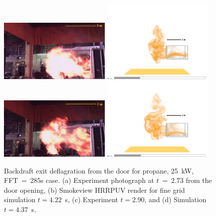 \documentclass[12pt,letterpaper]{article}
\begin{document}
\begin{flushleft}
%
\begin{figure}[tb]
    \centering
    \includegraphics[trim = 0mm 0mm 0mm 0mm, clip,width=0.48\textwidth]{IAFSS_Paper/Figures/246 vlcsnap-2023-01-30-22h18m26s991.png}
    \includegraphics[trim = 50mm 50mm 60mm 80mm, clip,width=0.48\textwidth]{IAFSS_Paper/Figures/NIST_Backdraft_Propane_25kW_285s_low_EXT2_HRRPUV_4p22s.png}
     \\
    \includegraphics[trim = 0mm 0mm 0mm 0mm, clip,width=0.48\textwidth]{IAFSS_Paper/Figures/246 vlcsnap-2023-01-30-22h18m40s863.png}
    \includegraphics[trim = 50mm 50mm 60mm 80mm, clip,width=0.48\textwidth]{IAFSS_Paper/Figures/NIST_Backdraft_Propane_25kW_285s_low_EXT2_HRRPUV_4p37s.png}
    \caption{Backdraft exit deflagration from the door for propane, 25~kW, FFT~=~285s case. (a) Experiment photograph at $t~=~2.73$ from the door opening, (b) Smokeview HRRPUV render for fine grid simulation $t=4.22$~s, (c) Experiment $t=2.90$, and (d) Simulation $t=4.37$~s.}
    \label{fig:prop_fire}
\end{figure}
%


\end{flushleft}
\end{document}
